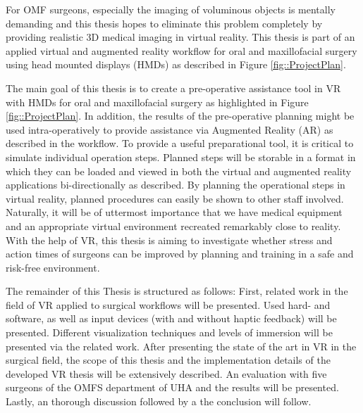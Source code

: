 For OMF surgeons, especially the imaging of voluminous objects is mentally demanding and this thesis hopes to eliminate this problem completely by providing realistic 3D medical imaging in virtual reality.
This thesis is part of an applied virtual and augmented reality workflow for oral and maxillofacial surgery using head mounted displays (HMDs) as described in Figure \ref{fig::ProjectPlan}.

The main goal of this thesis is to create a pre-operative assistance tool in VR with HMDs for oral and maxillofacial surgery as highlighted in Figure \ref{fig::ProjectPlan}. 
In addition, the results of the pre-operative planning might be used intra-operatively to provide assistance via Augmented Reality (AR) as described in the workflow.
To provide a useful preparational tool, it is critical to simulate individual operation steps.
Planned steps will be storable in a format in which they can be loaded and viewed in both the virtual and augmented reality applications bi-directionally as described.
By planning the operational steps in virtual reality, planned procedures can easily be shown to other staff involved.
Naturally, it will be of uttermost importance that we have medical equipment and an appropriate virtual environment recreated remarkably close to reality.
With the help of VR, this thesis is aiming to investigate whether stress and action times of surgeons can be improved by planning and training in a safe and risk-free environment.

The remainder of this Thesis is structured as follows:
\newline
First, related work in the field of VR applied to surgical workflows will be presented.
Used hard- and software, as well as input devices (with and without haptic feedback) will be presented.
Different visualization techniques and levels of immersion will be presented via the related work.
\newline
After presenting the state of the art in VR in the surgical field, the scope of this thesis and the implementation details of the developed VR thesis will be extensively described.
\newline
An evaluation with five surgeons of the OMFS department of UHA and the results will be presented.
\newline
Lastly, an thorough discussion followed by a the conclusion will follow.